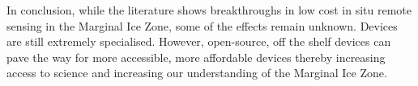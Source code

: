 In conclusion, while the literature shows breakthroughs in low cost in situ remote sensing in the Marginal Ice Zone, some of the effects remain unknown. Devices are still extremely specialised. However, open-source, off the shelf devices can pave the way for more accessible, more affordable devices thereby increasing access to science and increasing our understanding of the Marginal Ice Zone.